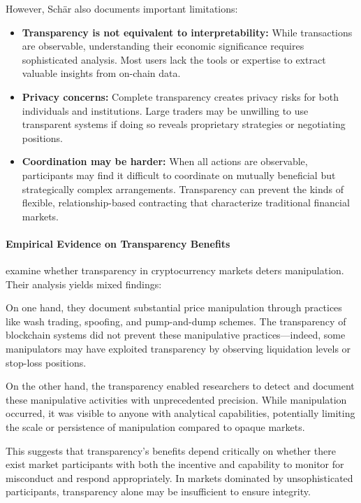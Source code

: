 However, Schär also documents important limitations:

\begin{itemize}
    \item \textbf{Transparency is not equivalent to interpretability:} While transactions are observable, understanding their economic significance requires sophisticated analysis. Most users lack the tools or expertise to extract valuable insights from on-chain data.
    
    \item \textbf{Privacy concerns:} Complete transparency creates privacy risks for both individuals and institutions. Large traders may be unwilling to use transparent systems if doing so reveals proprietary strategies or negotiating positions.
    
    \item \textbf{Coordination may be harder:} When all actions are observable, participants may find it difficult to coordinate on mutually beneficial but strategically complex arrangements. Transparency can prevent the kinds of flexible, relationship-based contracting that characterize traditional financial markets.
\end{itemize}

\paragraph{Empirical Evidence on Transparency Benefits}

 examine whether transparency in cryptocurrency markets deters manipulation. Their analysis yields mixed findings:

On one hand, they document substantial price manipulation through practices like wash trading, spoofing, and pump-and-dump schemes. The transparency of blockchain systems did not prevent these manipulative practices—indeed, some manipulators may have exploited transparency by observing liquidation levels or stop-loss positions.

On the other hand, the transparency enabled researchers to detect and document these manipulative activities with unprecedented precision. While manipulation occurred, it was visible to anyone with analytical capabilities, potentially limiting the scale or persistence of manipulation compared to opaque markets.

This suggests that transparency's benefits depend critically on whether there exist market participants with both the incentive and capability to monitor for misconduct and respond appropriately. In markets dominated by unsophisticated participants, transparency alone may be insufficient to ensure integrity.

